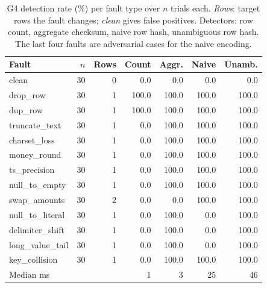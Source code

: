\begin{table}[t]
\centering
\caption{G4 detection rate (\%) per fault type over $n$ trials each. \emph{Rows}: target rows the fault changes; \emph{clean} gives false positives. Detectors: row count, aggregate checksum, naive row hash, unambiguous row hash. The last four faults are adversarial cases for the naive encoding.}
\label{tab:reconcile}
\scriptsize
\setlength{\tabcolsep}{2.5pt}
\begin{tabular}{lrrrrrr}
\toprule
Fault & $n$ & Rows & Count & Aggr. & Naive & Unamb. \\
\midrule
clean & 30 & 0 & 0.0 & 0.0 & 0.0 & 0.0 \\
drop\_row & 30 & 1 & 100.0 & 100.0 & 100.0 & 100.0 \\
dup\_row & 30 & 1 & 100.0 & 100.0 & 100.0 & 100.0 \\
truncate\_text & 30 & 1 & 0.0 & 100.0 & 100.0 & 100.0 \\
charset\_loss & 30 & 1 & 0.0 & 100.0 & 100.0 & 100.0 \\
money\_round & 30 & 1 & 0.0 & 100.0 & 100.0 & 100.0 \\
ts\_precision & 30 & 1 & 0.0 & 100.0 & 100.0 & 100.0 \\
null\_to\_empty & 30 & 1 & 0.0 & 100.0 & 100.0 & 100.0 \\
swap\_amounts & 30 & 2 & 0.0 & 0.0 & 100.0 & 100.0 \\
\midrule
null\_to\_literal & 30 & 1 & 0.0 & 100.0 & 0.0 & 100.0 \\
delimiter\_shift & 30 & 1 & 0.0 & 100.0 & 0.0 & 100.0 \\
long\_value\_tail & 30 & 1 & 0.0 & 100.0 & 0.0 & 100.0 \\
key\_collision & 30 & 1 & 0.0 & 100.0 & 100.0 & 100.0 \\
\midrule
Median ms & & & 1 & 3 & 25 & 46 \\
\bottomrule
\end{tabular}
\end{table}

